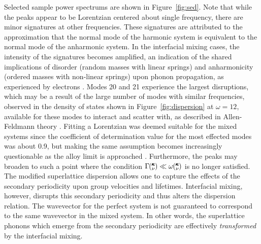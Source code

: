 \documentclass[aps,prb,preprint,preprintnumbers,amsmath,amssymb,floatfix,superscriptaddress]{revtex4}
\newcommand{\kv}{\mspace{-4.0mu}\left(\mspace{-8.0mu}
\begin{smallmatrix}&\pmb{\kappa} \\&\nu\end{smallmatrix}
\mspace{-3.0mu}\right)}
\begin{document}
Selected sample power spectrums are shown in Figure~\ref{fig:sed}. Note that while the peaks appear to be Lorentzian centered about single frequency, there are minor signatures at other frequencies. These signatures are attributed to the approximation that the normal mode of the harmonic system is equivalent to the normal mode of the anharmonic system. In the interfacial mixing cases, the intensity of the signatures becomes amplified, an indication of the shared implications of disorder (random masses with linear springs) and anharmonicity (ordered masses with non-linear springs) \cite{RevModPhys.53.175} upon phonon propagation, as experienced by electrons \cite{mott1961theory}. Modes 20 and 21 experience the largest disruptions, which may be a result of the large number of modes with similar frequencies, observed in the density of states shown in Figure~\ref{fig:dispersion} at $\omega=12$, available for these modes to interact and scatter with, as described in Allen-Feldmann theory \cite{allen_thermal_1993,feldman_thermal_1993-1}. Fitting a Lorentzian was deemed suitable for the mixed systems since the coefficient of determination value \cite{Cowpe20081066} for the most effected modes was about 0.9, but making the same assumption becomes increasingly questionable as the alloy limit is approached \cite{jason2013vc}. Furthermore, the peaks may broaden to such a point where the condition $\Gamma\kv \ll \omega\kv$ is no longer satisfied. The modified superlattice dispersion allows one to capture the effects of the secondary periodicity upon group velocities and lifetimes. Interfacial mixing, however, disrupts this secondary periodicity and thus alters the dispersion relation. The wavevector for the perfect system is not guaranteed to  correspond to the same wavevector in the mixed system. In other words, the superlattice phonons which emerge from the secondary periodicity are effectively \textit{transformed} by the interfacial mixing.
\begin{figure*}%
\begin{center}
\renewcommand{\figure}{Fig.}
\caption{(Colour online) Plots of the power spectrums for the selected modes along $\pmb{\kappa}=[1,0,0]$ of a $4\times4$ superlattice as indicated by the red square markers in the left frame of Figure~\ref{fig:dispersion}. Dark blue corresponds to a superlattice without mixing, red corresponds to mixing of 80/20 and light blue corresponds to mixing of 60/40. Lifetimes calculated from the fitting of the Lorentzian functions (not shown) for the three systems are presented.}
\label{fig:sed}
\end{center}
\end{figure*}
\end{document}
